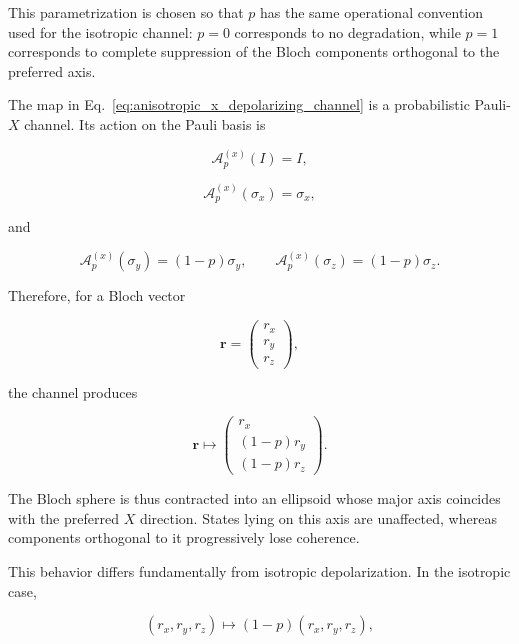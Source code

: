This parametrization is chosen so that \(p\) has the same operational convention
used for the isotropic channel: \(p=0\) corresponds to no degradation, while
\(p=1\) corresponds to complete suppression of the Bloch components orthogonal
to the preferred axis.

The map in Eq.~\eqref{eq:anisotropic_x_depolarizing_channel} is a probabilistic
Pauli-\(X\) channel. Its action on the Pauli basis is

\begin{equation}
\mathcal{A}^{(x)}_{p}(I)
=
I,
\end{equation}

\begin{equation}
\mathcal{A}^{(x)}_{p}(\sigma_x)
=
\sigma_x,
\label{eq:anisotropic_x_pauli_preserved}
\end{equation}

and

\begin{equation}
\mathcal{A}^{(x)}_{p}(\sigma_y)
=
(1-p)\sigma_y,
\qquad
\mathcal{A}^{(x)}_{p}(\sigma_z)
=
(1-p)\sigma_z.
\label{eq:anisotropic_x_pauli_contracted}
\end{equation}

Therefore, for a Bloch vector

\begin{equation}
\mathbf{r}
=
\begin{pmatrix}
r_x\\
r_y\\
r_z
\end{pmatrix},
\end{equation}

the channel produces

\begin{equation}
\mathbf{r}
\longmapsto
\begin{pmatrix}
r_x\\
(1-p)r_y\\
(1-p)r_z
\end{pmatrix}.
\label{eq:anisotropic_x_bloch_contraction}
\end{equation}

The Bloch sphere is thus contracted into an ellipsoid whose major axis coincides
with the preferred \(X\) direction. States lying on this axis are unaffected,
whereas components orthogonal to it progressively lose coherence.

This behavior differs fundamentally from isotropic depolarization. In the
isotropic case,

\begin{equation}
(r_x,r_y,r_z)
\longmapsto
(1-p)(r_x,r_y,r_z),
\end{equation}

